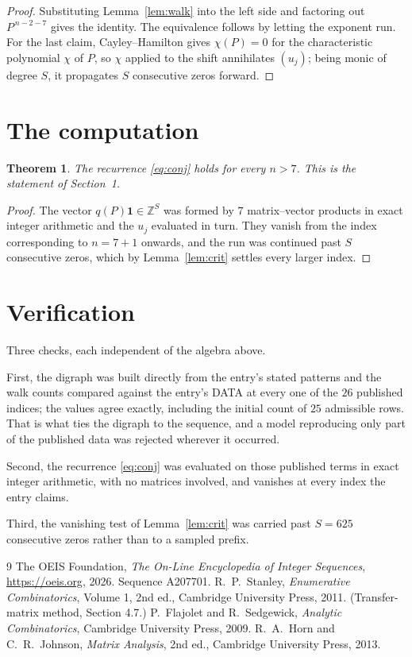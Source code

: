 \documentclass[11pt,a4paper]{article}
\theoremstyle{plain}
\newtheorem{theorem}{Theorem}
\theoremstyle{definition}
\begin{document}
\begin{proof}
Substituting Lemma~\ref{lem:walk} into the left side and factoring out
$P^{\,n-2-7}$ gives the identity. The equivalence follows by letting the exponent
run. For the last claim, Cayley--Hamilton gives $\chi(P)=0$ for the characteristic
polynomial $\chi$ of $P$, so $\chi$ applied to the shift annihilates $(u_j)$; being monic of
degree $S$, it propagates $S$ consecutive zeros forward.
\end{proof}

\section{The computation}

\begin{theorem}
The recurrence \eqref{eq:conj} holds for every $n>7$. This is the statement of
Section~1.
\end{theorem}

\begin{proof}
The vector $q(P)\mathbf{1}\in\mathbb{Z}^{S}$ was formed by $7$ matrix--vector
products in exact integer arithmetic and the $u_j$ evaluated in turn. They vanish from the
index corresponding to $n=7+1$ onwards, and the run was continued past $S$ consecutive
zeros, which by Lemma~\ref{lem:crit} settles every larger index.
\end{proof}

\section{Verification}

Three checks, each independent of the algebra above.

First, the digraph was built directly from the entry's stated patterns and the walk counts
compared against the entry's DATA at every one of the $26$ published indices; the
values agree exactly, including the initial count of $25$ admissible rows. That is
what ties the digraph to the sequence, and a model reproducing only part of the published
data was rejected wherever it occurred.

Second, the recurrence \eqref{eq:conj} was evaluated on those published terms in exact
integer arithmetic, with no matrices involved, and vanishes at every index the entry claims.

Third, the vanishing test of Lemma~\ref{lem:crit} was carried past $S=625$ consecutive
zeros rather than to a sampled prefix.

\begin{thebibliography}{9}
 The OEIS Foundation, \emph{The On-Line Encyclopedia of Integer
Sequences}, \url{https://oeis.org}, 2026. Sequence A207701.
 R.~P.~Stanley, \emph{Enumerative Combinatorics}, Volume 1, 2nd ed.,
Cambridge University Press, 2011. (Transfer-matrix method, Section 4.7.)
 P.~Flajolet and R.~Sedgewick, \emph{Analytic Combinatorics}, Cambridge
University Press, 2009.
 R.~A.~Horn and C.~R.~Johnson, \emph{Matrix Analysis}, 2nd ed., Cambridge
University Press, 2013.
\end{thebibliography}
\end{document}
